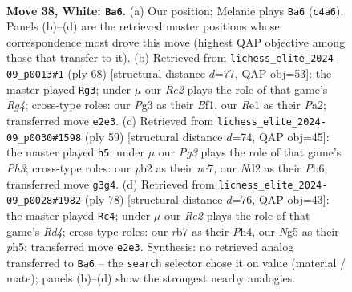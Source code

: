 \documentclass[11pt]{article}
\begin{document}
\clearpage

\begin{figure}[p]\centering
\begin{subfigure}{0.46\textwidth}\centering
\resizebox{\linewidth}{!}{%
\newchessgame
\chessboard[
  setfen={2b2k2/1r3p2/5np1/2q3Np/P1B5/6P1/1p1NRP1P/4R1K1 w - - 4 38},
  showmover=false,
  pgfstyle=straightmove, color=movearrow, markmove={c4-a6}
]}
\caption{}
\end{subfigure}\hfill
\begin{subfigure}{0.46\textwidth}\centering
\resizebox{\linewidth}{!}{%
\newchessgame
\chessboard[
  setfen={5r1k/1p6/2p4q/p3p3/4P1R1/2P1Rn1P/PP3PN1/5B1K w - - 2 35},
  showmover=false,
  pgfstyle=straightmove, color=movearrow, markmove={g4-g3}
]}
\caption{}
\end{subfigure}
\\[4pt]
\begin{subfigure}{0.46\textwidth}\centering
\resizebox{\linewidth}{!}{%
\newchessgame
\chessboard[
  setfen={5rk1/2N3p1/1p5p/4p3/6QP/1P2P1P1/P2n1r2/3R2K1 b - - 0 30},
  showmover=false,
  pgfstyle=straightmove, color=movearrow, markmove={h6-h5}
]}
\caption{}
\end{subfigure}\hfill
\begin{subfigure}{0.46\textwidth}\centering
\resizebox{\linewidth}{!}{%
\newchessgame
\chessboard[
  setfen={2r5/p3r1k1/1pb3p1/2nB3p/3RP2P/P3K1N1/3R2P1/8 w - - 17 40},
  showmover=false,
  pgfstyle=straightmove, color=movearrow, markmove={d4-c4}
]}
\caption{}
\end{subfigure}
\caption{\textbf{Move 38, White: \texttt{Ba6}.} (a) Our position; Melanie plays \texttt{Ba6} (\texttt{c4a6}). Panels (b)--(d) are the retrieved master positions whose correspondence most drove this move (highest QAP objective among those that transfer to it). (b) Retrieved from \texttt{lichess\_elite\_2024-09\_p0013\#1} (ply 68) [structural distance $d$=77, QAP obj=53]: the master played \texttt{Rg3}; under $\mu$ our \emph{Re2} plays the role of that game's \emph{Rg4}; cross-type roles: our \emph{P}g3 as their \emph{B}f1, our \emph{R}e1 as their \emph{P}a2; transferred move \texttt{e2e3}. (c) Retrieved from \texttt{lichess\_elite\_2024-09\_p0030\#1598} (ply 59) [structural distance $d$=74, QAP obj=45]: the master played \texttt{h5}; under $\mu$ our \emph{Pg3} plays the role of that game's \emph{Ph3}; cross-type roles: our \emph{p}b2 as their \emph{n}c7, our \emph{N}d2 as their \emph{P}b6; transferred move \texttt{g3g4}. (d) Retrieved from \texttt{lichess\_elite\_2024-09\_p0028\#1982} (ply 78) [structural distance $d$=76, QAP obj=43]: the master played \texttt{Rc4}; under $\mu$ our \emph{Re2} plays the role of that game's \emph{Rd4}; cross-type roles: our \emph{r}b7 as their \emph{P}h4, our \emph{N}g5 as their \emph{p}h5; transferred move \texttt{e2e3}. Synthesis: no retrieved analog transferred to \texttt{Ba6} -- the \texttt{search} selector chose it on value (material / mate); panels (b)--(d) show the strongest nearby analogies.}
\label{fig:thought-m74}
\end{figure}
\end{document}
